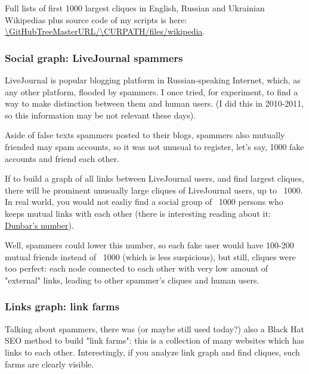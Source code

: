 Full lists of first 1000 largest cliques in English, Russian and Ukrainian Wikipedias plus source code of my scripts is here:
\url{\GitHubTreeMasterURL/\CURPATH/files/wikipedia}.

\subsubsection{Social graph: LiveJournal spammers}

LiveJournal is popular blogging platform in Russian-speaking Internet, which, as any other platform, flooded by spammers.
I once tried, for experiment, to find a way to make distinction between them and human users.
(I did this in 2010-2011, so this information may be not relevant these days).

Aside of false texts spammers posted to their blogs, spammers also mutually friended may spam accounts, so it was not unusual to register, let's say, 1000 fake
accounts and friend each other.

If to build a graph of all links between LiveJournal users, and find largest cliques, there will be prominent unusually large cliques of LiveJournal users, 
up to ~1000.
In real world, you would not easliy find a social group of ~1000 persons who keeps mutual links with each other 
(there is interesting reading about it: \href{https://en.wikipedia.org/w/index.php?title=Dunbar%27s_number}{Dunbar's number}).

Well, spammers could lower this number, so each fake user would have 100-200 mutual friends instead of ~1000 (which is less suspicious), but still, 
cliques were too perfect: each node connected to each other with very low
amount of "external" links, leading to other spammer's cliques and human users.

\subsubsection{Links graph: link farms}

Talking about spammers, there was (or maybe still used today?) also a Black Hat SEO method to build 
"link farms":
this is a collection of many websites which has links to each other.
Interestingly, if you analyze link graph and find cliques, such farms are clearly visible.

